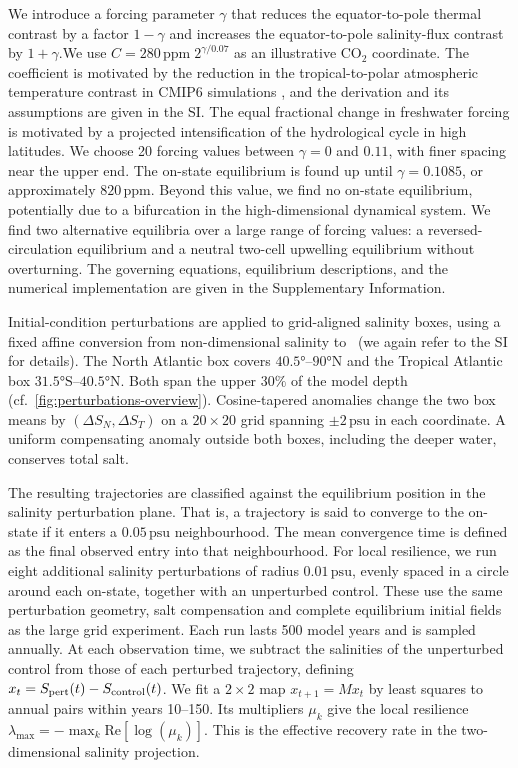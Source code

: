 \documentclass[12pt, a4paper]{article}
\newcommand{\psu}{\,\text{psu}}
\newcommand{\CO}{CO\ensuremath{_2}}
\begin{document}
We introduce a forcing parameter $\gamma$ that reduces the equator-to-pole thermal contrast by a factor $1-\gamma$ and increases the equator-to-pole salinity-flux contrast by $1+\gamma$.We use $C=280\,\text{ppm}\;2^{\gamma/0.07}$ as an illustrative \CO{} coordinate. The coefficient is motivated by the reduction in the tropical-to-polar atmospheric temperature contrast in CMIP6 simulations \citep{Hahn2021ContributionsPolarAmplification}, and the derivation and its assumptions are given in the SI. The equal fractional change in freshwater forcing is motivated by a projected intensification of the hydrological cycle in high latitudes. We choose 20 forcing values between $\gamma=0$ and $0.11$, with finer spacing near the upper end. The on-state equilibrium is found up until $\gamma=0.1085$, or approximately $820\,\text{ppm}$. Beyond this value, we find no on-state equilibrium, potentially due to a bifurcation in the high-dimensional dynamical system. We find two alternative equilibria over a large range of forcing values: a reversed-circulation equilibrium and a neutral two-cell upwelling equilibrium without overturning. The governing equations, equilibrium descriptions, and the numerical implementation are given in the Supplementary Information.

Initial-condition perturbations are applied to grid-aligned salinity boxes, using a fixed affine conversion from non-dimensional salinity to \psu{} (we again refer to the SI for details). The North Atlantic box covers $40.5°$--$90°\text{N}$ and the Tropical Atlantic box $31.5°\text{S}$--$40.5°\text{N}$. Both span the upper $30\%$ of the model depth (cf.~\ref{fig:perturbations-overview}). Cosine-tapered anomalies change the two box means by $(\Delta S_N,\Delta S_T)$ on a $20\times20$ grid spanning $\pm2\psu{}$ in each coordinate. A uniform compensating anomaly outside both boxes, including the deeper water, conserves total salt.

The resulting trajectories are classified against the equilibrium position in the salinity perturbation plane. That is, a trajectory is said to converge to the on-state if it enters a $0.05\psu{}$ neighbourhood. The mean convergence time is defined as the final observed entry into that neighbourhood. For local resilience, we run eight additional salinity perturbations of radius $0.01\psu{}$, evenly spaced in a circle around each on-state, together with an unperturbed control. These use the same perturbation geometry, salt compensation and complete equilibrium initial fields as the large grid experiment. Each run lasts 500 model years and is sampled annually. At each observation time, we subtract the salinities of the unperturbed control from those of each perturbed trajectory, defining $x_t=S_{\rm pert}(t)-S_{\rm control}(t)$. We fit a $2\times2$ map $x_{t+1}=M x_t$ by least squares to annual pairs within years 10--150. Its multipliers $\mu_k$ give the local resilience $\lambda_{\max}=-\max_k\mathrm{Re}[\log(\mu_k)]$. This is the effective recovery rate in the two-dimensional salinity projection.
\end{document}
